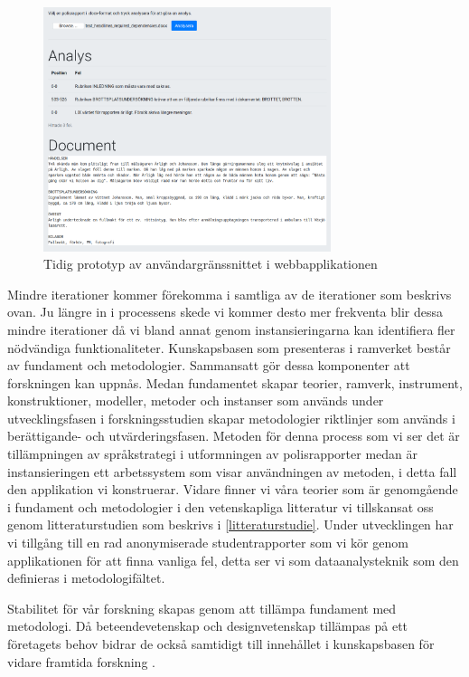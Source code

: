 \documentclass[swedish]{maucsthesis}
\begin{document}
\begin{figure}[H]
    \centering
    \includegraphics[width=0.75\textwidth]{tidigprototyp.png}
    \caption{Tidig prototyp av användargränssnittet i webbapplikationen}
    \label{fig:tidigprototyp}
\end{figure}

Mindre iterationer kommer förekomma i samtliga av de iterationer som beskrivs ovan. Ju
längre in i processens skede vi kommer desto mer frekventa blir dessa mindre
iterationer då vi bland annat genom instansieringarna kan identifiera fler
nödvändiga funktionaliteter. Kunskapsbasen som presenteras i ramverket består av
fundament och metodologier. Sammansatt gör dessa komponenter att forskningen kan
uppnås. Medan fundamentet skapar teorier, ramverk, instrument, konstruktioner,
modeller, metoder och instanser som används under utvecklingsfasen i
forskningsstudien skapar metodologier riktlinjer som används i berättigande- och
utvärderingsfasen. Metoden för denna process som vi ser det är tillämpningen av
språkstrategi i utformningen av polisrapporter medan är instansieringen ett
arbetssystem som visar användningen av metoden, i detta fall den applikation vi
konstruerar. Vidare finner vi våra teorier som är genomgående i fundament och
metodologier i den vetenskapliga litteratur vi tillskansat oss genom
litteraturstudien som beskrivs i \cref{litteraturstudie}. Under utvecklingen har vi
tillgång till en rad anonymiserade studentrapporter som vi kör genom
applikationen för att finna vanliga fel, detta ser vi som dataanalysteknik som
den definieras i metodologifältet.

Stabilitet för vår forskning skapas genom att tillämpa fundament med metodologi.
Då beteendevetenskap och designvetenskap tillämpas på ett företagets behov
bidrar de också samtidigt till innehållet i kunskapsbasen för vidare framtida
forskning \cite{hevner:2004}.
\end{document}
